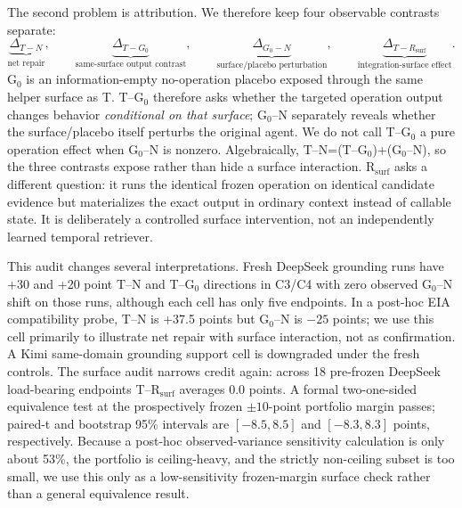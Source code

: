 The second problem is attribution. We therefore keep four observable contrasts separate:
\begin{equation}
\underbrace{\Delta_{T-N}}_{\text{net repair}},\qquad
\underbrace{\Delta_{T-G_0}}_{\text{same-surface output contrast}},\qquad
\underbrace{\Delta_{G_0-N}}_{\text{surface/placebo perturbation}},\qquad
\underbrace{\Delta_{T-R_{\mathrm{surf}}}}_{\text{integration-surface effect}}.
\end{equation}
G$_0$ is an information-empty no-operation placebo exposed through the same helper surface as T. T--G$_0$ therefore asks whether the targeted operation output changes behavior \emph{conditional on that surface}; G$_0$--N separately reveals whether the surface/placebo itself perturbs the original agent. We do not call T--G$_0$ a pure operation effect when G$_0$--N is nonzero. Algebraically, T--N=(T--G$_0$)+(G$_0$--N), so the three contrasts expose rather than hide a surface interaction. R$_{\mathrm{surf}}$ asks a different question: it runs the identical frozen operation on identical candidate evidence but materializes the exact output in ordinary context instead of callable state. It is deliberately a controlled surface intervention, not an independently learned temporal retriever.

This audit changes several interpretations. Fresh DeepSeek grounding runs have +30 and +20 point T--N and T--G$_0$ directions in C3/C4 with zero observed G$_0$--N shift on those runs, although each cell has only five endpoints. In a post-hoc EIA compatibility probe, T--N is +37.5 points but G$_0$--N is $-25$ points; we use this cell primarily to illustrate net repair with surface interaction, not as confirmation. A Kimi same-domain grounding support cell is downgraded under the fresh controls. The surface audit narrows credit again: across 18 pre-frozen DeepSeek load-bearing endpoints T--R$_{\mathrm{surf}}$ averages 0.0 points. A formal two-one-sided equivalence test at the prospectively frozen $\pm10$-point portfolio margin passes; paired-t and bootstrap 95\% intervals are $[-8.5,8.5]$ and $[-8.3,8.3]$ points, respectively. Because a post-hoc observed-variance sensitivity calculation is only about 53\%, the portfolio is ceiling-heavy, and the strictly non-ceiling subset is too small, we use this only as a low-sensitivity frozen-margin surface check rather than a general equivalence result.


